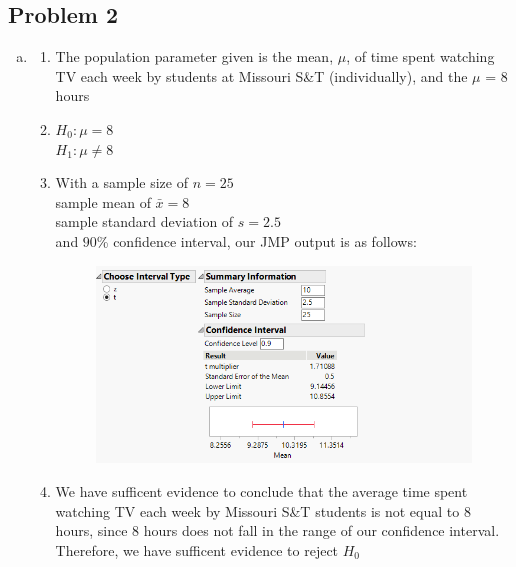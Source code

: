 \documentclass[14pt]{article}
\begin{document}
\subsection*{Problem 2}

\begin{enumerate}[(a)]
\item
\begin{enumerate}[1.]
\item
The population parameter given is the mean, $\mu$, of time spent watching TV each week by students at Missouri S\&T (individually), and the $\mu$ = 8 hours

\item
$H_0 : \mu = 8$ \\
$H_1 : \mu \neq 8$

\item
With a sample size of $n = 25$ \\
sample mean of $\bar{x} = 8$ \\
sample standard deviation of $s = 2.5$ \\ 
and $90$\% confidence interval, our JMP output is as follows:

\begin{figure}[h]
\centering
\includegraphics{exam2/2i.png}
\end{figure}
 
\item
We have sufficent evidence to conclude that the average time spent watching TV each week by Missouri S\&T students is not equal to 8 hours, since 8 hours does not fall in the range of our confidence interval. Therefore, we have sufficent evidence to reject $H_0$


\end{enumerate}

\pagebreak

\begin{enumerate}[1.]


\end{enumerate}
\end{enumerate}
\end{document}
